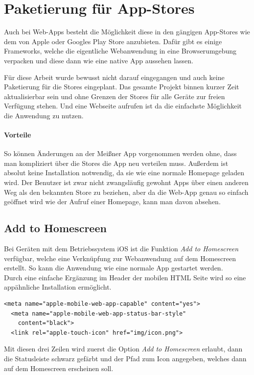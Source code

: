 
\section{Paketierung für App-Stores}
Auch bei Web-Apps besteht die Möglichkeit diese in den gängigen App-Stores wie dem von Apple oder Googles Play Store anzubieten. Dafür gibt es einige Frameworks, welche die eigentliche Webanwendung in eine Browserumgebung verpacken und diese dann wie eine native App aussehen lassen.\par
Für diese Arbeit wurde bewusst nicht darauf eingegangen und auch keine Paketierung für die Stores eingeplant. Das gesamte Projekt binnen kurzer Zeit aktualisierbar sein und ohne Grenzen der Stores für alle Geräte zur freien Verfügung stehen. Und eine Webseite aufrufen ist da die einfachste Möglichkeit die Anwendung zu nutzen.

\paragraph{Vorteile}
So können Änderungen an der Meißner App vorgenommen werden ohne, dass man kompliziert über die Stores die App neu verteilen muss. Außerdem ist absolut keine Installation notwendig, da sie wie eine normale Homepage geladen wird. Der Benutzer ist zwar nicht zwangsläufig gewohnt Apps über einen anderen Weg als den bekannten Store zu beziehen, aber da die Web-App genau so einfach geöffnet wird wie der Aufruf einer Homepage, kann man davon absehen.

\subsection{Add to Homescreen}
Bei Geräten mit dem Betriebssystem iOS ist die Funktion \emph{Add to Homescreen} verfügbar, welche eine Verknüpfung zur Webanwendung auf dem Homescreen erstellt. So kann die Anwendung wie eine normale App gestartet werden.\\
Durch eine einfache Ergänzung im Header der mobilen HTML Seite wird so eine appähnliche Installation ermöglicht.

\begin{lstlisting}[captionpos=b, caption=Ergänzung im Header der mobilen Seite]
  <meta name="apple-mobile-web-app-capable" content="yes">
  <meta name="apple-mobile-web-app-status-bar-style"
  	content="black">
  <link rel="apple-touch-icon" href="img/icon.png">
\end{lstlisting}
Mit diesen drei Zeilen wird zuerst die Option \emph{Add to Homescreen} erlaubt, dann die Statusleiste schwarz gefärbt und der Pfad zum Icon angegeben, welches dann auf dem Homescreen erscheinen soll.\par

